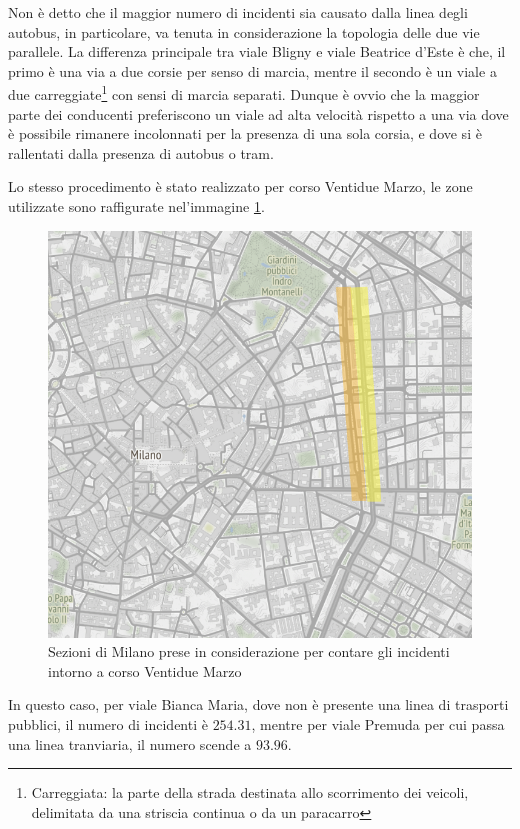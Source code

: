 \documentclass[a4paper]{report}
\begin{document}
Non è detto che il maggior numero di incidenti sia causato dalla linea degli autobus, 
in particolare, va tenuta in considerazione la topologia delle due vie parallele.
La differenza principale tra viale Bligny e viale Beatrice d'Este è che, il primo è una via a due 
corsie per senso di marcia, mentre il secondo è un viale a due 
carreggiate\footnote{Carreggiata: la parte della strada destinata allo scorrimento dei veicoli, 
delimitata da una striscia continua o da un paracarro} 
con sensi di marcia separati. 
Dunque è ovvio che la maggior parte dei conducenti preferiscono un viale ad alta velocità rispetto a 
una via dove è possibile rimanere incolonnati per la presenza di una sola corsia, e dove si è 
rallentati dalla presenza di autobus o tram.

Lo stesso procedimento è stato realizzato per corso Ventidue Marzo, le zone utilizzate sono 
raffigurate nel'immagine \ref{fig:zona-22marzo-rect}. 

\begin{figure}
    \includegraphics[width=\linewidth]{../src/atm/zona_22marzo_rect.png}
    \caption{Sezioni di Milano prese in considerazione per contare gli incidenti intorno a corso Ventidue Marzo}
    \label{fig:zona-22marzo-rect}
\end{figure}

In questo caso, per viale Bianca Maria, dove non è presente una linea di trasporti pubblici, 
il numero di incidenti è $254.31$, mentre per viale Premuda per cui passa una linea tranviaria, 
il numero scende a $93.96$.
\end{document}
